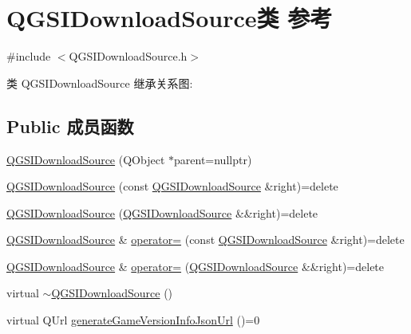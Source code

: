 \hypertarget{class_q_g_s_i_download_source}{}\section{Q\+G\+S\+I\+Download\+Source类 参考}
\label{class_q_g_s_i_download_source}


{\ttfamily \#include $<$Q\+G\+S\+I\+Download\+Source.\+h$>$}



类 Q\+G\+S\+I\+Download\+Source 继承关系图\+:
\subsection*{Public 成员函数}
\begin{DoxyCompactItemize}
\item 
\mbox{\hyperlink{class_q_g_s_i_download_source_a5a2eaa9bdfd6efbba1618bf649aba380}{Q\+G\+S\+I\+Download\+Source}} (Q\+Object $\ast$parent=nullptr)
\item 
\mbox{\hyperlink{class_q_g_s_i_download_source_a9916c2e7736363707fceda6ced958910}{Q\+G\+S\+I\+Download\+Source}} (const \mbox{\hyperlink{class_q_g_s_i_download_source}{Q\+G\+S\+I\+Download\+Source}} \&right)=delete
\item 
\mbox{\hyperlink{class_q_g_s_i_download_source_abaa2f62ab0844963c7b5911a369a7d3f}{Q\+G\+S\+I\+Download\+Source}} (\mbox{\hyperlink{class_q_g_s_i_download_source}{Q\+G\+S\+I\+Download\+Source}} \&\&right)=delete
\item 
\mbox{\hyperlink{class_q_g_s_i_download_source}{Q\+G\+S\+I\+Download\+Source}} \& \mbox{\hyperlink{class_q_g_s_i_download_source_ab8c145193be186e9c1385406d904010c}{operator=}} (const \mbox{\hyperlink{class_q_g_s_i_download_source}{Q\+G\+S\+I\+Download\+Source}} \&right)=delete
\item 
\mbox{\hyperlink{class_q_g_s_i_download_source}{Q\+G\+S\+I\+Download\+Source}} \& \mbox{\hyperlink{class_q_g_s_i_download_source_a78083cae9e279c9eadde7aeb028358d8}{operator=}} (\mbox{\hyperlink{class_q_g_s_i_download_source}{Q\+G\+S\+I\+Download\+Source}} \&\&right)=delete
\item 
virtual \mbox{\hyperlink{class_q_g_s_i_download_source_aea71fdb29f15d9231cad9dcc4f86f9b4}{$\sim$\+Q\+G\+S\+I\+Download\+Source}} ()
\item 
virtual Q\+Url \mbox{\hyperlink{class_q_g_s_i_download_source_afd99abed3078c54f167269bc6122bb71}{generate\+Game\+Version\+Info\+Json\+Url}} ()=0
\item 

\end{DoxyCompactItemize}
